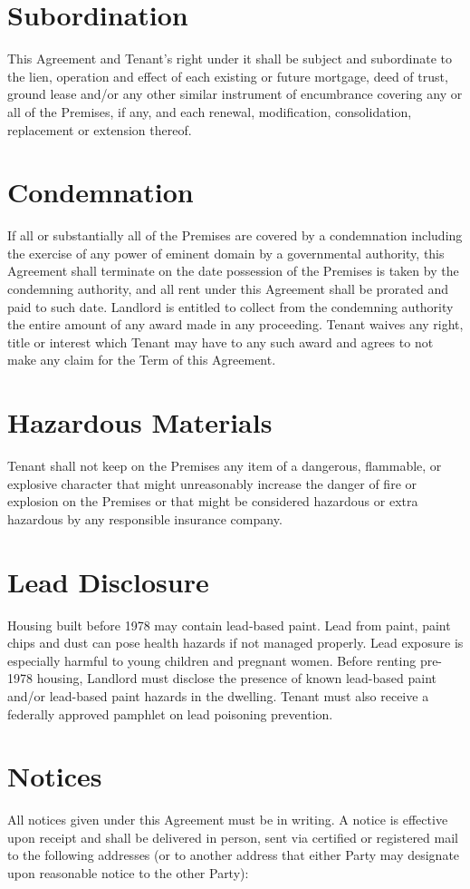 \documentclass[12pt]{article}
\begin{document}
{\section{Subordination}
This Agreement and Tenant's right under it shall be subject and subordinate to the lien,
operation and effect of each existing or future mortgage, deed of trust, ground lease and/or
any other similar instrument of encumbrance covering any or all of the Premises, if any, and
each renewal, modification, consolidation, replacement or extension thereof.

\section{Condemnation}
If all or substantially all of the Premises are covered by a condemnation including the
exercise of any power of eminent domain by a governmental authority, this Agreement shall
terminate on the date possession of the Premises is taken by the condemning authority, and all
rent under this Agreement shall be prorated and paid to such date. Landlord is entitled to
collect from the condemning authority the entire amount of any award made in any proceeding.
Tenant waives any right, title or interest which Tenant may have to any such award and agrees
to not make any claim for the Term of this Agreement.

\section{Hazardous Materials}
Tenant shall not keep on the Premises any item of a dangerous, flammable, or explosive
character that might unreasonably increase the danger of fire or explosion on the Premises or
that might be considered hazardous or extra hazardous by any responsible insurance company.

\section{Lead Disclosure}
Housing built before 1978 may contain lead-based paint. Lead from paint, paint chips and dust
can pose health hazards if not managed properly. Lead exposure is especially harmful to young
children and pregnant women. Before renting pre-1978 housing, Landlord must disclose the
presence of known lead-based paint and/or lead-based paint hazards in the dwelling. Tenant
must also receive a federally approved pamphlet on lead poisoning prevention.

\section{Notices}
All notices given under this Agreement must be in writing. A notice is effective upon receipt
and shall be delivered in person, sent via certified or registered mail to the following
addresses (or to another address that either Party may designate upon reasonable notice to the
other Party):

}
\end{document}
